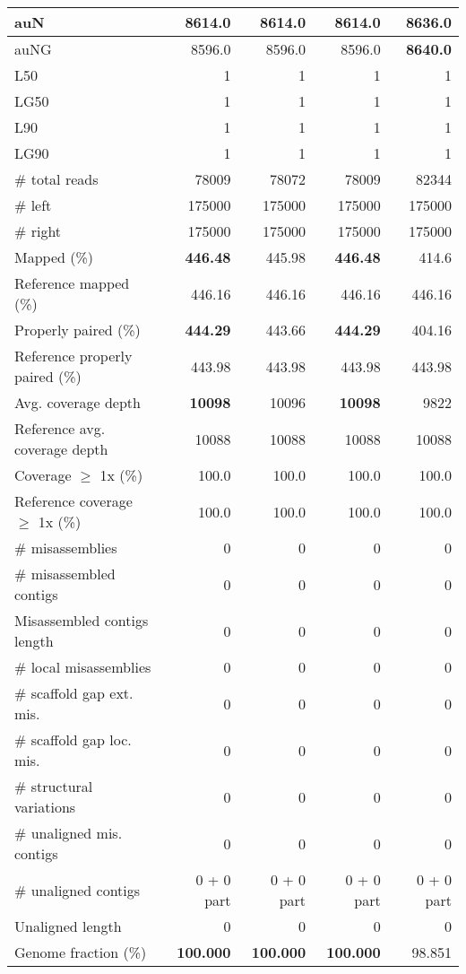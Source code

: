 \documentclass[12pt,a4paper]{article}
\begin{document}
\begin{table}[ht]
\begin{center}
\begin{tabular}{|l*{4}{|r}|}
auN & 8614.0 & 8614.0 & 8614.0 & {\bf 8636.0} \\ \hline
auNG & 8596.0 & 8596.0 & 8596.0 & {\bf 8640.0} \\ \hline
L50 & 1 & 1 & 1 & 1 \\ \hline
LG50 & 1 & 1 & 1 & 1 \\ \hline
L90 & 1 & 1 & 1 & 1 \\ \hline
LG90 & 1 & 1 & 1 & 1 \\ \hline
\# total reads & 78009 & 78072 & 78009 & 82344 \\ \hline
\# left & 175000 & 175000 & 175000 & 175000 \\ \hline
\# right & 175000 & 175000 & 175000 & 175000 \\ \hline
Mapped (\%) & {\bf 446.48} & 445.98 & {\bf 446.48} & 414.6 \\ \hline
Reference mapped (\%) & 446.16 & 446.16 & 446.16 & 446.16 \\ \hline
Properly paired (\%) & {\bf 444.29} & 443.66 & {\bf 444.29} & 404.16 \\ \hline
Reference properly paired (\%) & 443.98 & 443.98 & 443.98 & 443.98 \\ \hline
Avg. coverage depth & {\bf 10098} & 10096 & {\bf 10098} & 9822 \\ \hline
Reference avg. coverage depth & 10088 & 10088 & 10088 & 10088 \\ \hline
Coverage $\geq$ 1x (\%) & 100.0 & 100.0 & 100.0 & 100.0 \\ \hline
Reference coverage $\geq$ 1x (\%) & 100.0 & 100.0 & 100.0 & 100.0 \\ \hline
\# misassemblies & 0 & 0 & 0 & 0 \\ \hline
\# misassembled contigs & 0 & 0 & 0 & 0 \\ \hline
Misassembled contigs length & 0 & 0 & 0 & 0 \\ \hline
\# local misassemblies & 0 & 0 & 0 & 0 \\ \hline
\# scaffold gap ext. mis. & 0 & 0 & 0 & 0 \\ \hline
\# scaffold gap loc. mis. & 0 & 0 & 0 & 0 \\ \hline
\# structural variations & 0 & 0 & 0 & 0 \\ \hline
\# unaligned mis. contigs & 0 & 0 & 0 & 0 \\ \hline
\# unaligned contigs & 0 + 0 part & 0 + 0 part & 0 + 0 part & 0 + 0 part \\ \hline
Unaligned length & 0 & 0 & 0 & 0 \\ \hline
Genome fraction (\%) & {\bf 100.000} & {\bf 100.000} & {\bf 100.000} & 98.851 \\ \hline

\end{tabular}
\end{center}
\end{table}
\end{document}

